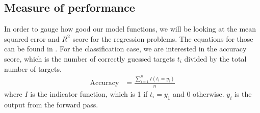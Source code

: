 \documentclass[a4paper]{article}
\begin{document}
\subsection{Measure of performance} \label{sec:performance}
In order to gauge how good our model functions, we will be looking at the mean squared error and $R^2$ score for the regression problems. The equations for those can be found in \cite{Github1}. For the classification case, we are interested in the accuracy score, which is the number of correctly guessed targets $t_i$ divided by the total number of targets.
\begin{align*}
	\text{Accuracy} &= \frac{\sum_{i=1}^n I(t_i = y_i)}{n}
\end{align*}
where $I$ is the indicator function, which is 1 if $t_i = y_1$ and 0 otherwise. $y_i$ is the output from the forward pass.
\end{document}
